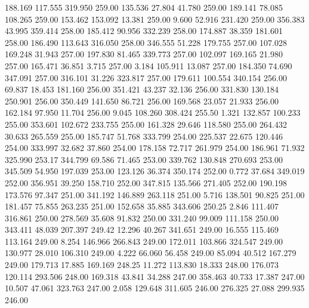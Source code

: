  188.169  117.555  319.950       259.00
 135.536   27.804   41.780       259.00
 189.141   78.085  108.265       259.00
 153.462  153.092   13.381       259.00
   9.600   52.916  231.420       259.00
 356.383   43.995  359.414       258.00
 185.412   90.956  332.239       258.00
 174.887   38.359  181.601       258.00
 186.490  113.643  316.050       258.00
 346.555   51.228  179.755       257.00
 107.028  169.248   31.943       257.00
 197.830   81.465  339.773       257.00
 102.097  169.165   21.980       257.00
 165.471   36.851    3.715       257.00
   3.184  105.911   13.087       257.00
 184.350   74.690  347.091       257.00
 316.101   31.226  323.817       257.00
 179.611  100.554  340.154       256.00
  69.837   18.453  181.160       256.00
 351.421   43.237   32.136       256.00
 331.830  130.184  250.901       256.00
 350.449  141.650   86.721       256.00
 169.568   23.057   21.933       256.00
 162.184   97.950   11.704       256.00
   9.045  108.260  308.424       255.50
   1.321  132.857  100.233       255.00
 353.601  102.672  233.755       255.00
 161.328   29.646  118.580       255.00
 264.432   30.633  265.559       255.00
 185.747   51.768  333.799       254.00
 225.537   22.675  120.446       254.00
 333.997   32.682   37.860       254.00
 178.158   72.717  261.979       254.00
 186.961   71.932  325.990       253.17
 344.799   69.586   71.465       253.00
 339.762  130.848  270.693       253.00
 345.509   54.950  197.039       253.00
 123.126   36.374  350.174       252.00
   0.772   37.684  349.019       252.00
 356.951   39.250  158.710       252.00
 347.815  135.566  271.405       252.00
 190.198  173.576   97.347       251.00
 341.192  146.889  263.118       251.00
   5.716  138.501   90.825       251.00
 181.457   75.855  263.235       251.00
 152.658   35.885  343.606       250.25
   2.846  111.407  316.861       250.00
 278.569   35.608   91.832       250.00
 331.240   99.009  111.158       250.00
 343.411   48.039  207.397       249.42
  12.296   40.267  341.651       249.00
  16.555  115.469  113.164       249.00
   8.254  146.966  266.843       249.00
 172.011  103.866  324.547       249.00
 130.977   28.010  106.310       249.00
   4.222   66.060   56.458       249.00
  85.094   40.512  167.279       249.00
 179.713   17.885  169.169       248.25
  11.272  113.830   18.333       248.00
 176.073  120.114  293.506       248.00
 169.318   43.841   34.288       247.00
 358.463   40.733   17.387       247.00
  10.507   47.061  323.763       247.00
   2.058  129.648  311.605       246.00
 276.325   27.088  299.935       246.00
